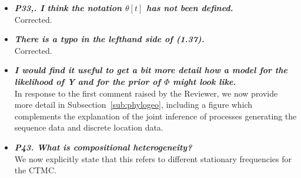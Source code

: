 \documentclass[english]{article}
\begin{document}
\begin{itemize}
\begin{quote}
\myeditsveleven
\end{quote}

\item {
{\it
\textbf{
P33,. I think the notation $\theta[t]$ has not been defined.
}%
}%
}%
\\
Corrected.




\item {
{\it
\textbf{
There is a typo in the lefthand side of (1.37).
}%
}%
}%
\\
Corrected.


\item {
{\it
\textbf{
I would find it useful to get a bit more detail how a model for the likelihood of Y and for the prior of $\Phi$ might look like.
}%
}%
}%
\\
In response to the first comment raised by the Reviewer, we now provide more detail in Subsection~\ref{sub:phylogeo}, including a figure which complements the explanation of the joint inference of processes generating the sequence data and discrete location data.




\item {
{\it
\textbf{
P43. What is compositional heterogeneity?
}%
}%
}%
\\
We now explicitly state that this refers to different stationary frequencies for the CTMC.

\begin{quote}
\myeditsvfifteen
\end{quote}



\end{itemize}
\end{document}
